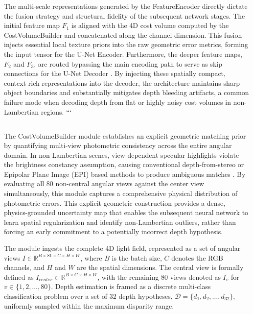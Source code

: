 \documentclass[lettersize,journal]{IEEEtran}
\begin{document}
The multi-scale representations generated by the FeatureEncoder directly dictate the fusion strategy and structural fidelity of the subsequent network stages. The initial feature map $F_1$ is aligned with the 4D cost volume computed by the CostVolumeBuilder and concatenated along the channel dimension. This fusion injects essential local texture priors into the raw geometric error metrics, forming the input tensor for the U-Net Encoder. Furthermore, the deeper feature maps, $F_2$ and $F_3$, are routed bypassing the main encoding path to serve as skip connections for the U-Net Decoder \cite{ronneberger2015}. By injecting these spatially compact, context-rich representations into the decoder, the architecture maintains sharp object boundaries and substantially mitigates depth bleeding artifacts, a common failure mode when decoding depth from flat or highly noisy cost volumes in non-Lambertian regions.
```

\subsection{}

The CostVolumeBuilder module establishes an explicit geometric matching prior by quantifying multi-view photometric consistency across the entire angular domain. In non-Lambertian scenes, view-dependent specular highlights violate the brightness constancy assumption, causing conventional depth-from-stereo or Epipolar Plane Image (EPI) based methods to produce ambiguous matches \cite{heber2018, lyu2022}. By evaluating all 80 non-central angular views against the center view simultaneously, this module captures a comprehensive physical distribution of photometric errors. This explicit geometric construction provides a dense, physics-grounded uncertainty map that enables the subsequent neural network to learn spatial regularization and identify non-Lambertian outliers, rather than forcing an early commitment to a potentially incorrect depth hypothesis.

The module ingests the complete 4D light field, represented as a set of angular views $I \in \mathbb{R}^{B \times 81 \times C \times H \times W}$, where $B$ is the batch size, $C$ denotes the RGB channels, and $H$ and $W$ are the spatial dimensions. The central view is formally defined as $I_{center} \in \mathbb{R}^{B \times C \times H \times W}$, with the remaining 80 views denoted as $I_v$ for $v \in \{1, 2, \ldots, 80\}$. Depth estimation is framed as a discrete multi-class classification problem over a set of 32 depth hypotheses, $\mathcal{D} = \{d_1, d_2, \ldots, d_{32}\}$, uniformly sampled within the maximum disparity range. 
\end{document}
